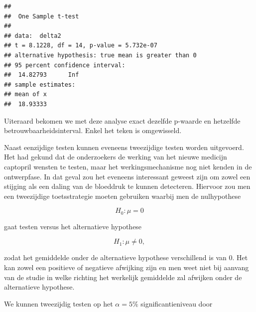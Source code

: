 \documentclass[
  12pt,dutch,coursenotes]{book}
\theoremstyle{definition}
\theoremstyle{definition}
\theoremstyle{definition}
\theoremstyle{definition}
\theoremstyle{remark}
\begin{document}
\begin{lstlisting}
## 
##  One Sample t-test
## 
## data:  delta2
## t = 8.1228, df = 14, p-value = 5.732e-07
## alternative hypothesis: true mean is greater than 0
## 95 percent confidence interval:
##  14.82793      Inf
## sample estimates:
## mean of x 
##  18.93333
\end{lstlisting}

Uiteraard bekomen we met deze analyse exact dezelfde p-waarde en hetzelfde betrouwbaarheidsinterval. Enkel het teken is omgewisseld.

Naast eenzijdige testen kunnen eveneens tweezijdige testen worden uitgevoerd.
Het had gekund dat de onderzoekers de werking van het nieuwe medicijn captopril wensten te testen, maar het werkingsmechanisme nog niet kenden in de ontwerpfase. In dat geval zou het eveneens interessant geweest zijn om zowel een stijging als een daling van de bloeddruk te kunnen detecteren.
Hiervoor zou men een tweezijdige toetsstrategie moeten gebruiken waarbij men de nulhypothese

\[H_0: \mu=0\]

gaat testen versus het alternatieve hypothese

\[H_1: \mu\neq0,\]

zodat het gemiddelde onder de alternatieve hypothese verschillend is van \(0\). Het kan zowel een positieve of negatieve afwijking zijn en men weet niet bij aanvang van de studie in welke richting het werkelijk gemiddelde zal afwijken onder de alternatieve hypothese.

We kunnen tweezijdig testen op het \(\alpha=5\%\) significantieniveau door
\end{document}
